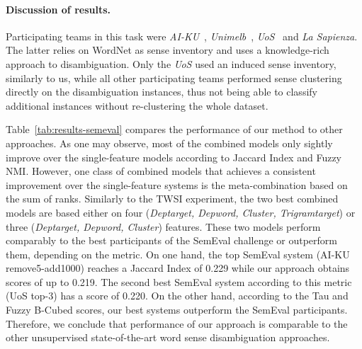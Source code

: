 \documentclass[11pt]{article}
\begin{document}


\paragraph{Discussion of results.}

Participating teams in this task were \emph{AI-KU}~\cite{Baskaya2013}, \emph{Unimelb}~\cite{Lau2013}, \emph{UoS}~\cite{Hope2013} and \emph{La Sapienza}. The latter relies on WordNet as sense inventory and uses a knowledge-rich approach to disambiguation. Only the \emph{UoS} used an induced sense inventory, similarly to us, while all other participating teams performed sense clustering directly on the disambiguation instances, thus not being able to classify additional instances without re-clustering the whole dataset.

Table~\ref{tab:results-semeval} compares the performance of our method to other approaches. As one may observe, most of the combined models only sightly improve over the single-feature models according to Jaccard Index and Fuzzy NMI. However, one class of combined models that achieves a consistent improvement over the single-feature systems is the meta-combination based on the sum of ranks. Similarly to the TWSI experiment, the two best combined models are based either on four (\textit{Deptarget, Depword, Cluster, Trigramtarget}) or three (\textit{Deptarget, Depword, Cluster}) features. These two models perform comparably to the best participants of the SemEval challenge or outperform them, depending on the metric. On one hand, the top SemEval system  (AI-KU remove5-add1000) reaches a Jaccard Index of 0.229 while our approach obtains scores of up to 0.219. The second best SemEval system according to this metric (UoS top-3) has a score of 0.220. On the other hand, according to the Tau and Fuzzy B-Cubed scores, our best systems outperform the SemEval participants.  Therefore, we conclude that performance of our approach is comparable to the other unsupervised state-of-the-art word sense disambiguation approaches.
\end{document}
